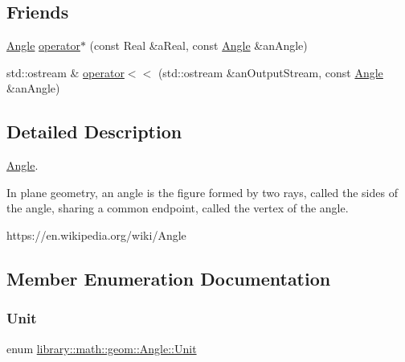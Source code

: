 \subsection*{Friends}
\begin{DoxyCompactItemize}
\item 
\hyperlink{classlibrary_1_1math_1_1geom_1_1_angle}{Angle} \hyperlink{classlibrary_1_1math_1_1geom_1_1_angle_af699984b24759466957ecddaa7e61fc9}{operator$\ast$} (const Real \&a\+Real, const \hyperlink{classlibrary_1_1math_1_1geom_1_1_angle}{Angle} \&an\+Angle)
\item 
std\+::ostream \& \hyperlink{classlibrary_1_1math_1_1geom_1_1_angle_a0846b77ee3281e8a559197c3c3208eed}{operator$<$$<$} (std\+::ostream \&an\+Output\+Stream, const \hyperlink{classlibrary_1_1math_1_1geom_1_1_angle}{Angle} \&an\+Angle)
\end{DoxyCompactItemize}


\subsection{Detailed Description}
\hyperlink{classlibrary_1_1math_1_1geom_1_1_angle}{Angle}. 

In plane geometry, an angle is the figure formed by two rays, called the sides of the angle, sharing a common endpoint, called the vertex of the angle.

https\+://en.wikipedia.\+org/wiki/\+Angle 

\subsection{Member Enumeration Documentation}
\mbox{\label{classlibrary_1_1math_1_1geom_1_1_angle_ab593c4dafbb9a5c29fdbe114eaae8eae}} 
\subsubsection{\texorpdfstring{Unit}{Unit}}
{\footnotesize\ttfamily enum \hyperlink{classlibrary_1_1math_1_1geom_1_1_angle_ab593c4dafbb9a5c29fdbe114eaae8eae}{library\+::math\+::geom\+::\+Angle\+::\+Unit}\hspace{0.3cm}{\ttfamily [strong]}}

